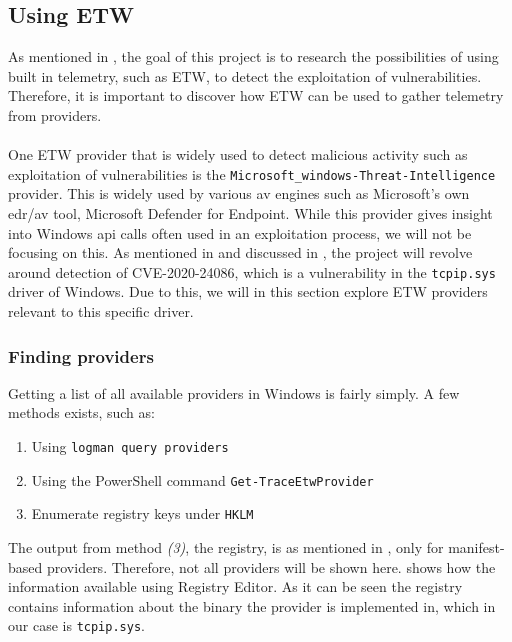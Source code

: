 \documentclass{report}
\begin{document}
\subsection{Using \acrfull{ETW}}
\label{cha:etw:constructing-trace-session}
As mentioned in , the goal of this project is to research the possibilities of using built in telemetry, such as \gls{ETW}, to detect the exploitation of vulnerabilities. Therefore, it is important to discover how \gls{ETW} can be used to gather telemetry from providers.
\\
\\
One \gls{ETW} provider that is widely used to detect malicious activity such as exploitation of vulnerabilities is the \texttt{Microsoft_windows-Threat-Intelligence}\cite{url:etw:etwti} provider. This is widely used by various \gls{av} engines such as Microsoft's own \gls{edr}/\gls{av} tool, Microsoft Defender for Endpoint. While this provider gives insight into Windows \gls{api} calls often used in an exploitation process, we will not be focusing on this. As mentioned in  and discussed in , the project will revolve around detection of CVE-2020-24086, which is a vulnerability in the \texttt{tcpip.sys} driver of Windows. Due to this, we will in this section explore \gls{ETW} providers relevant to this specific driver.

\subsubsection{Finding providers}
Getting a list of all available providers in Windows is fairly simply. A few methods exists, such as:

\begin{enumerate}
    \item Using \texttt{logman query providers}
    \item Using the PowerShell command \texttt{Get-TraceEtwProvider}
    \item Enumerate registry keys under \texttt{HKLM\SOFTWARE\Microsoft\Windows\CurrentVersion\WINEVT\Publishers}
\end{enumerate}

The output from method \emph{(3)}, the registry, is as mentioned in , only for manifest-based providers. Therefore, not all providers will be shown here.  shows how the information available using Registry Editor. As it can be seen the registry contains information about the binary the provider is implemented in, which in our case is \texttt{tcpip.sys}. 
\end{document}
